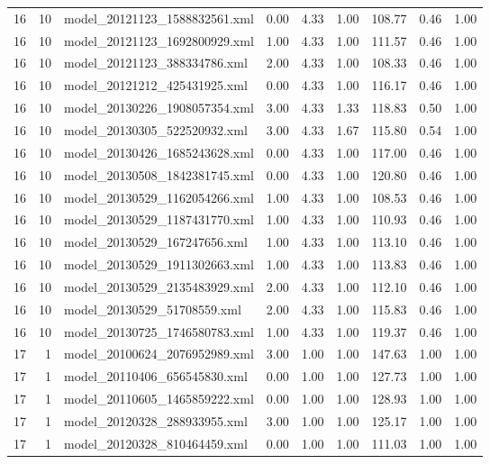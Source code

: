 \begin{table}[ht]
\begin{tabular}{rrlrrrrrr}
   16 &  10 & model\_20121123\_1588832561.xml & 0.00 & 4.33 & 1.00 & 108.77 & 0.46 & 1.00 \\ 
   16 &  10 & model\_20121123\_1692800929.xml & 1.00 & 4.33 & 1.00 & 111.57 & 0.46 & 1.00 \\ 
   16 &  10 & model\_20121123\_388334786.xml & 2.00 & 4.33 & 1.00 & 108.33 & 0.46 & 1.00 \\ 
   16 &  10 & model\_20121212\_425431925.xml & 0.00 & 4.33 & 1.00 & 116.17 & 0.46 & 1.00 \\ 
   16 &  10 & model\_20130226\_1908057354.xml & 3.00 & 4.33 & 1.33 & 118.83 & 0.50 & 1.00 \\ 
   16 &  10 & model\_20130305\_522520932.xml & 3.00 & 4.33 & 1.67 & 115.80 & 0.54 & 1.00 \\ 
   16 &  10 & model\_20130426\_1685243628.xml & 0.00 & 4.33 & 1.00 & 117.00 & 0.46 & 1.00 \\ 
   16 &  10 & model\_20130508\_1842381745.xml & 0.00 & 4.33 & 1.00 & 120.80 & 0.46 & 1.00 \\ 
   16 &  10 & model\_20130529\_1162054266.xml & 1.00 & 4.33 & 1.00 & 108.53 & 0.46 & 1.00 \\ 
   16 &  10 & model\_20130529\_1187431770.xml & 1.00 & 4.33 & 1.00 & 110.93 & 0.46 & 1.00 \\ 
   16 &  10 & model\_20130529\_167247656.xml & 1.00 & 4.33 & 1.00 & 113.10 & 0.46 & 1.00 \\ 
   16 &  10 & model\_20130529\_1911302663.xml & 1.00 & 4.33 & 1.00 & 113.83 & 0.46 & 1.00 \\ 
   16 &  10 & model\_20130529\_2135483929.xml & 2.00 & 4.33 & 1.00 & 112.10 & 0.46 & 1.00 \\ 
   16 &  10 & model\_20130529\_51708559.xml & 2.00 & 4.33 & 1.00 & 115.83 & 0.46 & 1.00 \\ 
   16 &  10 & model\_20130725\_1746580783.xml & 1.00 & 4.33 & 1.00 & 119.37 & 0.46 & 1.00 \\ 
   17 &   1 & model\_20100624\_2076952989.xml & 3.00 & 1.00 & 1.00 & 147.63 & 1.00 & 1.00 \\ 
   17 &   1 & model\_20110406\_656545830.xml & 0.00 & 1.00 & 1.00 & 127.73 & 1.00 & 1.00 \\ 
   17 &   1 & model\_20110605\_1465859222.xml & 0.00 & 1.00 & 1.00 & 128.93 & 1.00 & 1.00 \\ 
   17 &   1 & model\_20120328\_288933955.xml & 3.00 & 1.00 & 1.00 & 125.17 & 1.00 & 1.00 \\ 
   17 &   1 & model\_20120328\_810464459.xml & 0.00 & 1.00 & 1.00 & 111.03 & 1.00 & 1.00 \\ 

\end{tabular}
\end{table}
